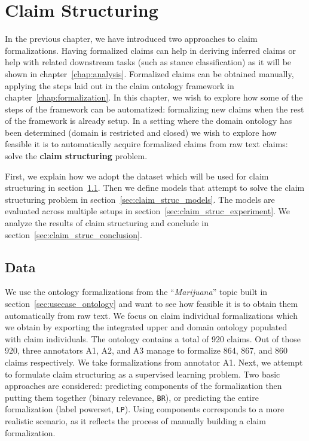 \chapter{Claim Structuring}
\label{chap:claim_structuring}

In the previous chapter, we have introduced two approaches to claim
formalizations.  Having formalized claims can help in deriving inferred claims
or help with related downstream tasks (such as stance classification) as it
will be shown in chapter~\ref{chap:analysis}.
Formalized claims can be obtained manually, applying the steps laid out in the 
claim ontology framework in chapter~\ref{chap:formalization}. 
In this chapter, we wish to explore how some of the steps of the framework can 
be automatized: formalizing new claims when the rest of the framework is already setup.
In a setting where the domain ontology has been determined (domain is
restricted and closed) we wish to explore how feasible it is to automatically
acquire formalized claims from raw text claims: solve the \textbf{claim structuring}
problem.

First, we explain how we adopt the dataset which will be used for claim
structuring in section~\ref{sec:claim_struc_data}.  Then we define models that
attempt to solve the claim structuring problem in
section~\ref{sec:claim_struc_models}.  The models are evaluated across multiple
setups in section~\ref{sec:claim_struc_experiment}. We analyze the results of
claim structuring and conclude in section~\ref{sec:claim_struc_conclusion}. 

\section{Data}
\label{sec:claim_struc_data}

We use the ontology formalizations from the 
``\emph{Marijuana}'' topic built in section~\ref{sec:usecase_ontology} and 
want to see how feasible it is to obtain them automatically from raw text.
We focus on claim individual formalizations which we obtain by exporting
the integrated upper and domain ontology populated with claim individuals. 
The ontology contains a total of 920 claims. Out of those 920, three annotators 
A1, A2, and A3 manage to formalize 864, 867, and 860 claims respectively.
We take formalizations from annotator A1. 
Next, we attempt to formulate claim structuring as a supervised learning
problem.  Two basic approaches are considered: predicting components of the
formalization then putting them together (binary relevance, \texttt{BR}), or
predicting the entire formalization (label powerset, \texttt{LP}). 
Using components corresponds to a more realistic scenario, as it reflects 
the process of manually building a claim formalization. 

